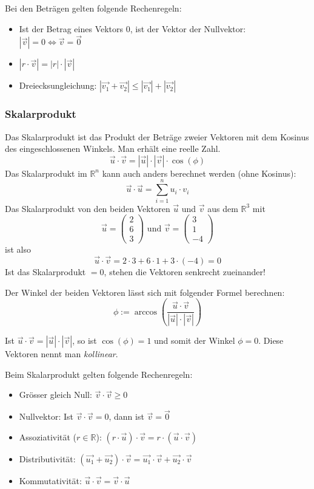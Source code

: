 Bei den Beträgen gelten folgende Rechenregeln:
\begin{itemize}
  \item Ist der Betrag eines Vektors $0$, ist der Vektor der Nullvektor:
    $|\vec{v}| = 0 \Leftrightarrow \vec{v} = \vec{0}$
  \item $|r \cdot \vec{v}| = |r| \cdot |\vec{v}|$
  \item Dreiecksungleichung: $|\vec{v_1} + \vec{v_2}| \le 
    |\vec{v_1}| + |\vec{v_2}|$
\end{itemize}

\subsubsection{Skalarprodukt}
Das Skalarprodukt ist das Produkt der Beträge zweier Vektoren mit dem
Kosinus des eingeschlossenen Winkels. Man erhält eine reelle Zahl.
\[ \vec{u} \cdot \vec{v} = |\vec{u}| \cdot |\vec{v}| \cdot \cos{(\phi)} \]
Das Skalarprodukt im $\mathbb{R}^n$ kann auch anders berechnet werden
(ohne Kosinus):
\[ \vec{u} \cdot \vec{u} = \sum \limits_{i = 1}^n u_i \cdot v_i \]
Das Skalarprodukt von den beiden Vektoren $\vec{u}$ und
$\vec{v}$ aus dem $\mathbb{R}^3$ mit
\[ \vec{u} = \left( \begin{array}{c} 2 \\ 6 \\ 3 \end{array}\right)
\text{ und } \vec{v} = \left( \begin{array}{c} 3 \\ 1 \\ -4 \end{array}\right) \]
ist also
\[ \vec{u} \cdot \vec{v} = 2 \cdot 3 + 6 \cdot 1 + 3 \cdot (-4) = 0 \]
Ist das Skalarprodukt $= 0$, stehen die Vektoren senkrecht zueinander!

Der Winkel der beiden Vektoren lässt sich mit folgender Formel
berechnen:
\[ \phi := \arccos{\left(\frac{\vec{u} \cdot \vec{v}}{|\vec{u}| \cdot
|\vec{v}|}\right)} \]

Ist $\vec{u} \cdot \vec{v} = |\vec{u}| \cdot |\vec{v}|$, so ist
$\cos(\phi) = 1$ und somit der Winkel $\phi = 0$. Diese Vektoren nennt
man \emph{kollinear}.

Beim Skalarprodukt gelten folgende Rechenregeln:
\begin{itemize}
  \item Grösser gleich Null: $\vec{v} \cdot \vec{v} \ge 0$
  \item Nullvektor: Ist $\vec{v} \cdot \vec{v} = 0$, dann ist $\vec{v} = \vec{0}$
  \item Assoziativität ($r \in \mathbb{R}$): $(r \cdot \vec{u}) \cdot \vec{v} 
    = r \cdot ( \vec{u} \cdot \vec{v})$
  \item Distributivität: $(\vec{u_1} + \vec{u_2}) \cdot \vec{v} 
    = \vec{u_1} \cdot \vec{v} + \vec{u_2} \cdot \vec{v}$
  \item Kommutativität: $\vec{u} \cdot \vec{v} = \vec{v} \cdot \vec{u}$
\end{itemize}

